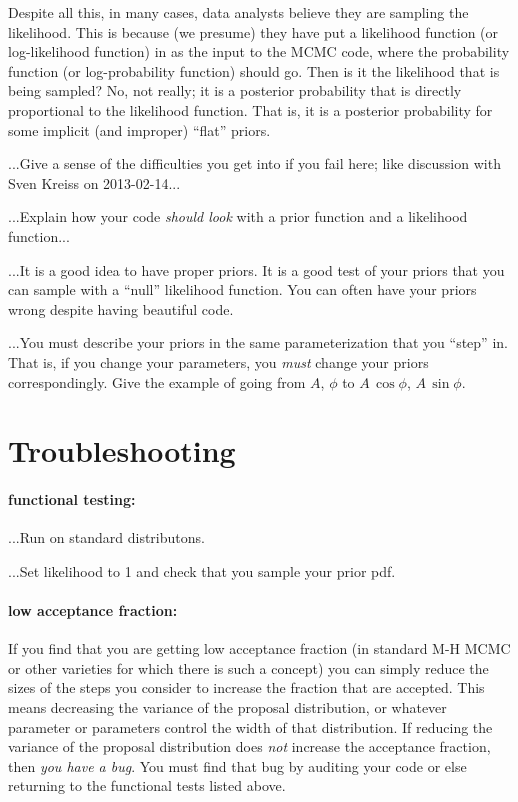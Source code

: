 \documentclass[12pt,twoside,pdftex]{article}
\begin{document}
Despite all this, in many cases,
  data analysts believe they are sampling the likelihood.
This is because (we presume) they have put a likelihood function
  (or log-likelihood function)
  in as the input to the MCMC code, where the probability function
  (or log-probability function) should go.
Then is it the likelihood that is being sampled?
No, not really;
it is a posterior probability that is directly proportional to the likelihood function.
That is, it is a posterior probability for some implicit (and improper) ``flat'' priors.

...Give a sense of the difficulties you get into if you fail here; like
discussion with Sven Kreiss on 2013-02-14...

...Explain how your code \emph{should look} with a prior function and a likelihood function...

...It is a good idea to have proper priors.
It is a good test of your priors that you can sample with a ``null'' likelihood function.
You can often have your priors wrong despite having beautiful code.

...You must describe your priors in the same parameterization that you ``step'' in.
That is, if you change your parameters, you \emph{must} change your priors correspondingly.
Give the example of going from $A$, $\phi$ to $A\,\cos\phi$, $A\,\sin\phi$.

\section{Troubleshooting}

\paragraph{functional testing:}
...Run on standard distributons.

...Set likelihood to 1 and check that you sample your prior pdf.

\paragraph{low acceptance fraction:}
If you find that you are getting low acceptance fraction
  (in standard M-H MCMC or other varieties for which there is such a concept)
  you can simply reduce the sizes of the steps you consider to increase the fraction that are accepted.
This means decreasing the variance of the proposal distribution,
  or whatever parameter or parameters control the width of that distribution.
If reducing the variance of the proposal distribution does \emph{not} increase the acceptance fraction,
  then \emph{you have a bug}.
You must find that bug by auditing your code or else returning to the functional tests listed above.
\end{document}
